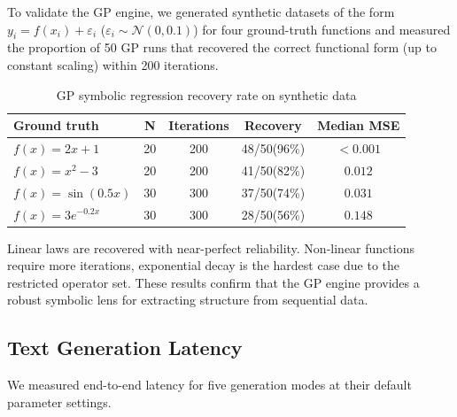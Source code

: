\documentclass[11pt,a4paper]{article}
\begin{document}
To validate the GP engine, we generated synthetic datasets of the form $y_i = f(x_i) + \varepsilon_i$ ($\varepsilon_i \sim \mathcal{N}(0, 0.1)$) for four ground-truth functions and measured the proportion of 50 GP runs that recovered the correct functional form (up to constant scaling) within 200 iterations.

\begin{table}[H]
\centering
\caption{GP symbolic regression recovery rate on synthetic data}
\label{tab:sr}
\renewcommand{\arraystretch}{1.3}
\begin{tabular}{@{}lcccc@{}}
\toprule
\rowcolor{lmmHeaderBg}
{\color{white}\textbf{Ground truth}} &
{\color{white}\textbf{N}} &
{\color{white}\textbf{Iterations}} &
{\color{white}\textbf{Recovery}} &
{\color{white}\textbf{Median MSE}} \\
\midrule
\rowcolor{white}         $f(x) = 2x + 1$      & 20 & 200 & 48/50\;(96\%) & $<0.001$ \\
\rowcolor{lmmRowAlt}     $f(x) = x^2 - 3$     & 20 & 200 & 41/50\;(82\%) & $0.012$  \\
\rowcolor{white}         $f(x) = \sin(0.5x)$  & 30 & 300 & 37/50\;(74\%) & $0.031$  \\
\rowcolor{lmmRowAlt}     $f(x) = 3e^{-0.2x}$ & 30 & 300 & 28/50\;(56\%) & $0.148$  \\
\bottomrule
\end{tabular}
\end{table}

Linear laws are recovered with near-perfect reliability. Non-linear functions require more iterations, exponential decay is the hardest case due to the restricted operator set. These results confirm that the GP engine provides a robust symbolic lens for extracting structure from sequential data.

\subsection{Text Generation Latency}

We measured end-to-end latency for five generation modes at their default parameter settings.
\end{document}

